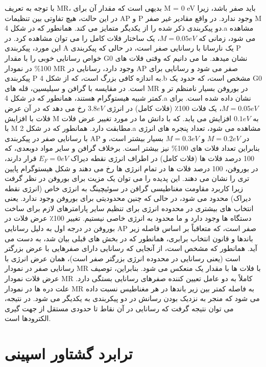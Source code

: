 با توجه به تعریف MR، بدیهی است که مقدار آن برای M = 0 eV باید صفر باشد، زیرا در این حالت، هیچ تفاوتی بین تنظیمات AP و P وجود ندارد. در واقع مقادیر غیر صفر M دو پیکربندی ذکر شده را از یکدیگر متمایز می کند. همانطور که در شکل 4.a مشاهده می شود، زمانی که $M = 0.05 eV$، یک ساختار فلات کامل را می توان مشاهده کرد. در این مورد، پیکربندی A یک نارسانا با رسانایی صفر است، در حالی که پیکربندی P خواص رسانایی خوبی را با مقدار G0 نشان میدهد. ما می دانیم که وقتی فلات های 100\% در نمودار MR وجود دارد، رسانایی در AP صفر می شود و رسانایی برای پیکربندی P به اندازه کافی بزرگ است، که از شکل 4.b مشخص است، که حدود یک G0 است. در مقایسه با گرافن و سیلیسین، قله های MR در بوروفن بسیار نامنظم تر و کمتر شبیه هیستوگرام هستند، همانطور که در شکل 4.a نشان داده شده است. برای $M = 0.05 eV$، یک فلات 100٪ (فلات کامل) در انرژی $3.8 eV$ رخ می دهد که در آن عرض فلات با افزایش M به $0.1 eV$ افزایش می یابد. که با دانش ما در مورد تغییر عرض فلات با M مطابقت دارد.
همانطور که در شکل 2.a مشاهده می شود، تعداد پنجره های انرژی با رسانایی صفر در پیکربندی AP در $M = 0.2 eV$ و $M = 0.3 eV$ بسیار بیشتر است، و بنابراین تعداد فلات های 100\% نیز بیشتر است. برخلاف گرافن و سایر مواد دوبعدی، که 100 درصد فلات ها (فلات کامل) در اطراف انرژی نقطه دیراک $E_F = 0 eV$ قرار دارند، در بوروفن، 100 درصد فلات ها در تمام انرژی ها رخ می دهند و شکل هیستوگرام پایین تری را نشان می دهند. این پدیده را می توان یک مزیت برای بوروفن در نظر گرفت زیرا کاربرد مقاومت مغناطیسی گرافن در سوئیچینگ به انرژی خاص (انرژی نقطه دیراک) محدود می شود، در حالی که چنین محدودیتی برای بوروفن وجود ندارد. یعنی انتخاب های بیشتری در محدوده انرژی برای تنظیم سایر پارامترهای لازم برای ساخت دستگاه ها وجود دارد و ما محدود به انرژی خاصی نیستیم. تغییر 100٪ عرض فلات در بوروفن در درجه اول به دلیل رسانایی AP صفر است، که متعاقباً بر اساس فاصله زیر باندها و قانون انتخاب برابری، همانطور که در بخش های قبلی بیان شد، به دست می آید. همانطور که مشخص است، از آنجایی که رسانایی دارای صفرهایی با عرض بزرگتر است (یعنی رسانایی در محدوده انرژی بزرگتر صفر است)، همان عرض انرژی با رسانایی صفر در نمودار MR با فلات ها با مقدار یک منعکس می شود. بنابراین، توصیف عرض فلات نمودار MR کاملاً به دو عامل تعیین کننده صفرهای رسانایی بستگی دارد. علت دره ها در نمودار MR به فاصله کمتر بین زیر باندها در هر مغناطیس نسبت داده می شود که منجر به نزدیک بودن رسانش در دو پیکربندی به یکدیگر می شود. در نتیجه، می توان نتیجه گرفت که رسانایی در آن نقاط تا حدودی مستقل از جهت گیری الکترودها است. 
\section{ترابرد گشتاور اسپینی}

